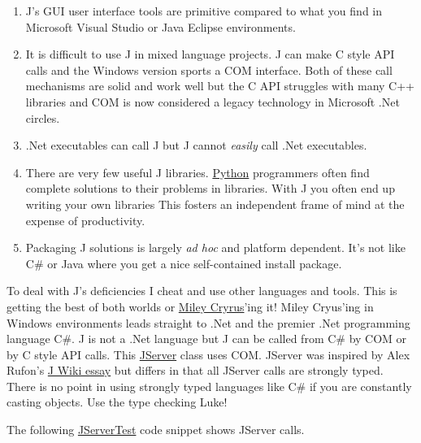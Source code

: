 \begin{enumerate}
\item
  J's GUI user interface tools are primitive compared to what you find
  in Microsoft Visual Studio or Java Eclipse environments.
\item
  It is difficult to use J in mixed language projects. J can make C
  style API calls and the Windows version sports a COM interface. Both
  of these call mechanisms are solid and work well but the C API
  struggles with many C++ libraries and COM is now considered a legacy
  technology in Microsoft .Net circles.
\item
  .Net executables can call J but J cannot \emph{easily} call .Net
  executables.
\item
  There are very few useful J libraries.
  \href{http://pypi.python.org/pypi/}{Python} programmers often find
  complete solutions to their problems in libraries. With J you often
  end up writing your own libraries This fosters an independent frame of
  mind at the expense of productivity.
\item
  Packaging J solutions is largely \emph{ad hoc} and platform dependent.
  It's not like C\# or Java where you get a nice self-contained install
  package.
\end{enumerate}
To deal with J's deficiencies I cheat and use other languages and tools.
This is getting the best of both worlds or
\href{http://www.stlyrics.com/lyrics/hannahmontana/bestofbothworlds.htm}{Miley
Cryrus}'ing it! Miley Cryus'ing in Windows environments leads straight
to .Net and the premier .Net programming language C\#. J is not a .Net
language but J can be called from C\# by COM or by C style API calls.
This
\href{http://cid-f964330e36001519.skydrive.live.com/self.aspx/Public/cs/JServer10may27.zip}{JServer}
class uses COM. JServer was inspired by Alex Rufon's
\href{http://202.67.223.49/jwiki/Guides/J\%20CSharp}{J Wiki essay} but
differs in that all JServer calls are strongly typed. There is no point
in using strongly typed languages like C\# if you are constantly casting
objects. Use the type checking Luke!

The following
\href{http://cid-f964330e36001519.skydrive.live.com/self.aspx/Public/cs/JServerTest10may27.zip}{JServerTest}
code snippet shows JServer calls.

